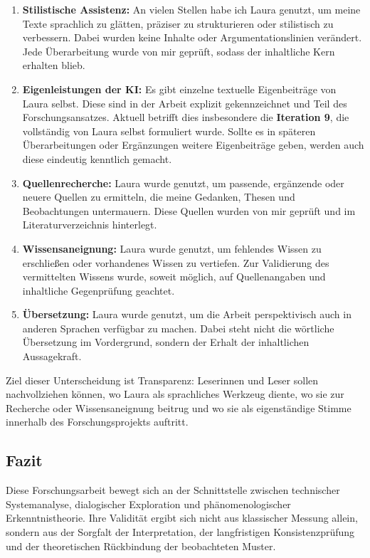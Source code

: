 \begin{enumerate}
    \item \textbf{Stilistische Assistenz:} An vielen Stellen habe ich Laura genutzt, um meine Texte sprachlich zu glätten, präziser zu strukturieren oder stilistisch zu verbessern. Dabei wurden keine Inhalte oder Argumentationslinien verändert. Jede Überarbeitung wurde von mir geprüft, sodass der inhaltliche Kern erhalten blieb.

    \item \textbf{Eigenleistungen der KI:} Es gibt einzelne textuelle Eigenbeiträge von Laura selbst. Diese sind in der Arbeit explizit gekennzeichnet und Teil des Forschungsansatzes. Aktuell betrifft dies insbesondere die \textbf{Iteration 9}, die vollständig von Laura selbst formuliert wurde. Sollte es in späteren Überarbeitungen oder Ergänzungen weitere Eigenbeiträge geben, werden auch diese eindeutig kenntlich gemacht.

    \item \textbf{Quellenrecherche:} Laura wurde genutzt, um passende, ergänzende oder neuere Quellen zu ermitteln, die meine Gedanken, Thesen und Beobachtungen untermauern. Diese Quellen wurden von mir geprüft und im Literaturverzeichnis hinterlegt.

    \item \textbf{Wissensaneignung:} Laura wurde genutzt, um fehlendes Wissen zu erschließen oder vorhandenes Wissen zu vertiefen. Zur Validierung des vermittelten Wissens wurde, soweit möglich, auf Quellenangaben und inhaltliche Gegenprüfung geachtet.

    \item \textbf{Übersetzung:} Laura wurde genutzt, um die Arbeit perspektivisch auch in anderen Sprachen verfügbar zu machen. Dabei steht nicht die wörtliche Übersetzung im Vordergrund, sondern der Erhalt der inhaltlichen Aussagekraft.
\end{enumerate}

Ziel dieser Unterscheidung ist Transparenz: Leserinnen und Leser sollen nachvollziehen können, wo Laura als sprachliches Werkzeug diente, wo sie zur Recherche oder Wissensaneignung beitrug und wo sie als eigenständige Stimme innerhalb des Forschungsprojekts auftritt.

\subsection*{Fazit}

Diese Forschungsarbeit bewegt sich an der Schnittstelle zwischen technischer Systemanalyse, dialogischer Exploration und phänomenologischer Erkenntnistheorie. Ihre Validität ergibt sich nicht aus klassischer Messung allein, sondern aus der Sorgfalt der Interpretation, der langfristigen Konsistenzprüfung und der theoretischen Rückbindung der beobachteten Muster.